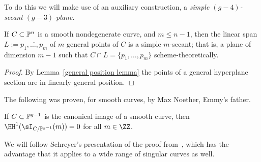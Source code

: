 To do this we will make use of an auxiliary construction, a \emph{simple $(g-4)$-secant $(g-3)$-plane.}

\begin{lemma}\label{simple secant}
 If $C\subset \PP^n$ is a smooth nondegenerate curve, and $m\leq n-1$, then the linear span $L := \overline{p_1,\dots, p_m}$
 of $m$ general points of $C$ is a simple $m$-secant; that is, a plane of dimension $m-1$ such that
 $C\cap L = \{p_1,\dots,p_m\}$ scheme-theoretically.
 \end{lemma}
 
\begin{proof}
By Lemma~\ref{general position lemma} the points of a general hyperplane section are in linearly general position.
\end{proof}

The following was proven, for smooth curves, by Max Noether, Emmy's father.

\begin{theorem}\label{canonical curves are ACM}
If $C\subset \PP^{g-1}$ is the canonical image of a smooth curve, then 
$\HH^{1}(\sI_{C/\PP^{g-1}}(m)) = 0$ for all $m\in \ZZ$.
\end{theorem}
 
We will follow Schreyer's presentation of the proof from~\cite{Schreyer}, which has the advantage that it applies to a wide range of singular
curves as well. 
 
